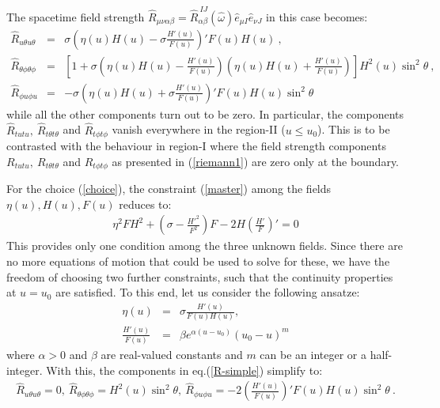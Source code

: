 \documentclass[preprint,aps,superscriptaddress,nofootinbib]{revtex4-1}
\begin{document}
The spacetime field strength 
$\hat{R}_{\mu\nu\alpha\beta}=\hat{R}_{\alpha\beta}^{~IJ} 
(\hat{\omega})\hat{e}_{\mu I} \hat{e}_{\nu J}$ in this case becomes:
\begin{eqnarray}\label{R-simple}
\hat{R}_{u\theta u \theta}&=&\sigma\left(\eta (u) H(u)-\sigma\frac{H'(u)}
{F(u)}\right)'F(u) H(u) ~,\nonumber\\
%
\hat{R}_{\theta\phi\theta\phi}&=&\left[1+\sigma\left(\eta(u) 
H(u)-\frac{H'(u)}{F(u)}\right)\left(\eta(u) H(u)+\frac{H'(u)}
{F(u)}\right)\right]H^2(u) \sin^2 \theta~, \nonumber\\
%
\hat{R}_{\phi u\phi u}&=&-\sigma\left(\eta(u) H(u)+\sigma\frac{H'(u)}
{F(u)}\right)'F(u) H(u)\sin^2 \theta 
\end{eqnarray}
while all the other components turn out to be zero. In particular, the 
components $\hat{R}_{tutu},~\hat{R}_{t\theta t\theta}$ and 
$\hat{R}_{t\phi t\phi}$ vanish   everywhere in the region-II ($u\le u_0$).
This is to be contrasted with the behaviour in region-I where the 
field strength components  $R_{tutu}, ~R_{t\theta t\theta}$ and 
$R_{t\phi t\phi}$ as presented in (\ref{riemann1}) are zero only 
at the boundary. 
 
For the choice (\ref{choice}),  the constraint (\ref{master})  among 
the fields $\eta(u),H(u),F(u)$ reduces to:
\begin{eqnarray}\label{master1}
\eta^2 FH^2
+\left(\sigma-\frac{H'^2}{F^2}\right)F-2 H\left(\frac{H'}{F}\right)'=0
\end{eqnarray}
This provides only one condition among the three unknown fields. Since 
there are no more equations of motion that could be used to solve for 
these, we have the freedom of choosing two further constraints, such that 
the continuity properties at $u=u_0$ are satisfied. To this end, let us 
consider the following ansatze:
\begin{eqnarray}\label{eqn1}
\eta(u)&=&\sigma\frac{H'(u)}{F(u)H(u)},\nonumber\\
\frac{H'(u)}{F(u)}&=&\beta e^{\alpha(u-u_0)} (u_0-u)^m
\end{eqnarray} 
where $\alpha>0$ and $\beta$ are real-valued constants and $m$ can 
be an integer or a half-integer. 
With this, the components in eq.(\ref{R-simple}) simplify to:
\begin{eqnarray}\label{R-simp}
\hat{R}_{u\theta u \theta}=0,~
%
\hat{R}_{\theta\phi\theta\phi}= H^2(u) \sin^2 \theta,~
%
\hat{R}_{\phi u\phi u}=-2\left(\frac{H'(u)}{F(u)}\right)'
F(u) H(u)\sin^2 \theta ~.
\end{eqnarray}
\end{document}
